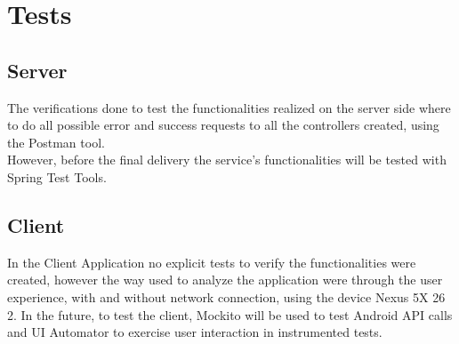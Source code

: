 \chapter{Tests}
\section*{Server}
The verifications done to test the functionalities realized on the server side where to do all possible error and success requests to all the controllers created, using the Postman tool. \\
However, before the final delivery the service's functionalities will be tested with Spring Test Tools. 

\section*{Client}
In the Client Application no explicit tests to verify the functionalities were created, however the way used to analyze the 
application were through the user experience, with and without network connection, using the device Nexus 5X 26 2.
In the future, to test the client, Mockito will be used to test Android API calls and UI Automator to exercise user interaction in instrumented tests.